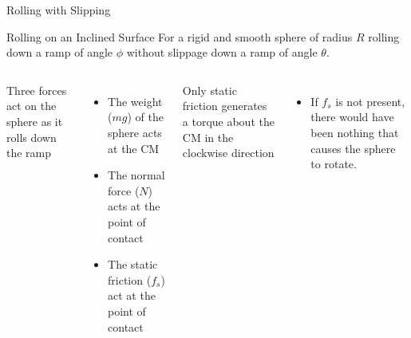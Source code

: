 \documentclass[12pt,compress,aspectratio=169]{beamer}
\begin{document}
\begin{frame}{Rolling with Slipping}
\end{frame}




\begin{frame}{Rolling on an Inclined Surface}
  For a rigid and smooth sphere of radius $R$ rolling down a ramp of angle
  $\phi$ without slippage down a ramp of angle $\theta$.

  \vspace{.2in}
  \begin{columns}

    Three forces act on the sphere as it rolls down the ramp
    \begin{itemize}
    \item The weight ($mg$) of the sphere acts at the CM
    \item The normal force ($N$) acts at the point of contact
    \item The static friction ($f_s$) act at the point of contact
    \end{itemize}
    Only static friction generates a torque about the CM in the clockwise
    direction
    \begin{itemize}
    \item If $f_s$ is not present, there would have been nothing that causes
      the sphere to rotate.
    \end{itemize}
  \end{columns}
\end{frame}
\end{document}
